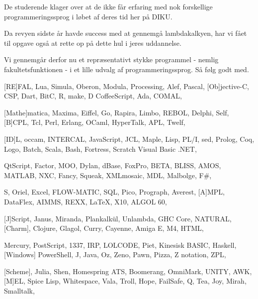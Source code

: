 \documentclass[a4paper,11pt]{article}
\begin{document}
\begin{sketch}

   De studerende klager over at de ikke får erfaring med nok
  forskellige programmeringssprog i løbet af deres tid her på DIKU.

   Da revyen sidste år havde success med at gennemgå
  lambdakalkyen, har vi fået til opgave også at rette op på dette hul
  i jeres uddannelse.

   Vi gennemgår derfor nu et repræsentativt stykke programmel
  - nemlig fakultetsfunktionen - i et lille udvalg af
  programmeringssprog. Så følg godt med.
\end{sketch}

\begin{song}


  [RE]FAL, Lua, Simula,
  Oberon, Modula,
  Processing, Alef, Pascal,
  [Ob]jective-C, CSP,
  Dart, BitC, R, make, D
  CoffeeScript, Ada, COMAL,

  [Mathe]matica, Maxima,
  Eiffel, Go, Rapira,
  Limbo, REBOL, Delphi, Self,
  [B]CPL, Tcl,
  Perl, Erlang, OCaml,
  HyperTalk, APL, Twelf,

  [ID]L, occam, INTERCAL,
  JavaScript, JCL,
  Maple, Lisp, PL/I, sed,
  Prolog, Coq, Logo, Batch,
  Scala, Bash, Fortress, Scratch
  Visual Basic .NET,


  QtScript, Factor, MOO,
  Dylan, dBase, FoxPro,
  BETA, BLISS, AMOS, MATLAB,
  NXC, Fancy, Squeak,
  XMLmosaic,
  MDL, Malbolge, F\#,

  S, Oriel, Excel,
  FLOW-MATIC, SQL,
  Pico, Prograph, Averest,
  [A]MPL, DataFlex,
  AIMMS, REXX,
  LaTeX, X10, ALGOL 60,

  [J]Script, Janus, Miranda,
  Plankalkül, Unlambda,
  GHC Core, NATURAL,
  [Charm], Clojure, Glagol, Curry,
  Cayenne, Amiga E,
  M4, HTML,


  Mercury, PostScript, 1337,
  IRP, LOLCODE, Piet,
  Kinesisk BASIC, Haskell,
  [Windows] PowerShell, J, Java,
  Oz, Zeno, Pawn, Pizza,
  Z notation, ZPL,

  [Scheme], Julia, Shen, Homespring
  ATS, Boomerang,
  OmniMark, UNITY, AWK,
  [M]EL, Spice Lisp, Whitespace,
  Vala, Troll, Hope, FailSafe,
  Q, Tea, Joy, Mirah, Smalltalk,


\end{song}
\end{document}
